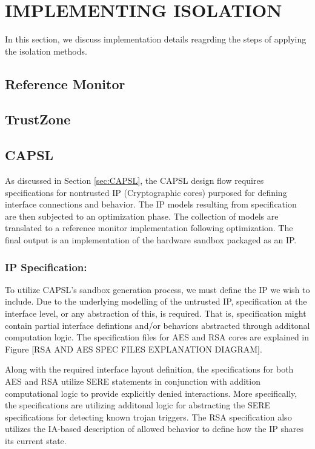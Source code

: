\documentclass[sigconf]{acmart}
\theoremstyle{plain}
\theoremstyle{remark}
\begin{document}
\section{IMPLEMENTING ISOLATION} \label{sec:Implementation}
In this section, we discuss implementation details reagrding the steps of applying the isolation methods.

\subsection{Reference Monitor}

\subsection{TrustZone}

\subsection{CAPSL}

As discussed in Section \ref{sec:CAPSL}, the CAPSL design flow requires specifications for nontrusted IP (Cryptographic cores) purposed for defining interface connections and behavior. The IP models resulting from specification are then subjected to an optimization phase. The collection of models are translated to a reference monitor implementation following optimization. The final output is an implementation of the hardware sandbox packaged as an IP.

\subsubsection{IP Specification:}

To utilize CAPSL's sandbox generation process, we must define the IP we wish to include. Due to the underlying modelling of the untrusted IP, specification at the interface level, or any abstraction of this, is required. That is, specification might contain partial interface defintions and/or behaviors abstracted through additonal computation logic. The specification files for AES and RSA cores are explained in Figure [RSA AND AES SPEC FILES EXPLANATION DIAGRAM].

Along with the required interface layout definition, the specifications for both AES and RSA utilize SERE statements in conjunction with addition computational logic to provide explicitly denied interactions. More specifically, the specifications are utilizing additonal logic for abstracting the SERE specifications for detecting known trojan triggers. The RSA specification also utilizes the IA-based description of allowed behavior to define how the IP shares its current state.
\end{document}
